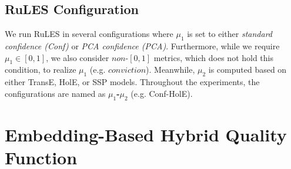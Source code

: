 \subsection{RuLES Configuration}
We run RuLES in several configurations where $\mu_1$ is set to either \textit{standard confidence (Conf)} or \textit{PCA confidence (PCA)}. Furthermore, while we require $\mu_1 \in [0,1]$, we also consider $non\text{-}[0,1]$ metrics, which does not hold this condition, to realize $\mu_1$ (e.g. $conviction$). Meanwhile, $\mu_2$ is computed based on either TransE, HolE, or SSP models.
Throughout the experiments, the configurations are named as \textbf{$\mu_1$-$\mu_2$} (e.g. Conf-HolE). 

\section{Embedding-Based Hybrid Quality Function}
